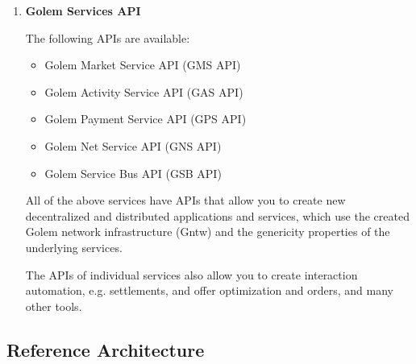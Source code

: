 \begin{enumerate}
\item {\bf Golem Services API}

The following APIs are available:

\begin{itemize}
\item Golem Market Service API (GMS API)
\item Golem Activity Service API (GAS API)
\item Golem Payment Service API (GPS API)
\item Golem Net Service API (GNS API)
\item Golem Service Bus API (GSB API)
\end{itemize}

All of the above services have APIs that allow you to create new decentralized and distributed applications and services,
which use the created Golem network infrastructure (Gntw) and the genericity properties of the underlying services.

The APIs of individual services also allow you to create interaction automation, e.g. settlements, 
and offer optimization and orders, and many other tools.

\end{enumerate}



\break

\subsection{Reference Architecture}